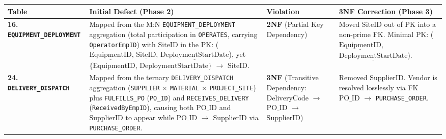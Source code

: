 \documentclass[a4paper,12pt]{report}
\newcounter{none} %
\begin{document}
{\footnotesize

{\def\LTcaptype{none} %
\begin{longtable}[]{@{}
  >{\raggedright\arraybackslash}p{}
  >{\raggedright\arraybackslash}p{}
  >{\centering\arraybackslash}p{}
  >{\raggedright\arraybackslash}p{}@{}}
\toprule\noalign{}
\begin{minipage}[b]{\linewidth}\raggedright
Table
\end{minipage} & \begin{minipage}[b]{\linewidth}\raggedright
Initial Defect (Phase 2)
\end{minipage} & \begin{minipage}[b]{\linewidth}\centering
Violation
\end{minipage} & \begin{minipage}[b]{\linewidth}\raggedright
3NF Correction (Phase 3)
\end{minipage} \\
\midrule\noalign{}
\endhead
\bottomrule\noalign{}
\endlastfoot
\textbf{16. \texttt{EQUIPMENT\_\allowbreak{}DEPLOYMENT}} & Mapped from the M:N \texttt{EQUIPMENT\_\allowbreak{}DEPLOYMENT} aggregation (total participation in \texttt{OPERATES}, carrying \texttt{OperatorEmpID}) with \(\text{SiteID}\) in the PK: (\(\underline{\text{EquipmentID}}\), \(\underline{\text{SiteID}}\), \(\underline{\text{DeploymentStartDate}}\)), yet \(\{\text{EquipmentID}\), \(\text{DeploymentStartDate}\}\) \(\rightarrow\) \(\text{SiteID}\). & \textbf{2NF} (Partial Key Dependency) & Moved \(\text{SiteID}\) out of PK into a non-prime FK. Minimal PK: (\(\underline{\text{EquipmentID}}\), \(\underline{\text{DeploymentStartDate}}\)). \\
\textbf{24. \texttt{DELIVERY\_\allowbreak{}DISPATCH}} & Mapped from the ternary \texttt{DELIVERY\_\allowbreak{}DISPATCH} aggregation (\texttt{SUPPLIER} \(\times\) \texttt{MATERIAL} \(\times\) \texttt{PROJECT\_\allowbreak{}SITE}) plus \texttt{FULFILLS\_\allowbreak{}PO} (\texttt{PO\_\allowbreak{}ID}) and \texttt{RECEIVES\_\allowbreak{}DELIVERY} (\texttt{ReceivedByEmpID}), causing both \(\text{PO\_ID}\) and \(\text{SupplierID}\) to appear while \(\text{PO\_ID}\) \(\rightarrow\) \(\text{SupplierID}\) via \texttt{PURCHASE\_\allowbreak{}ORDER}. & \textbf{3NF} (Transitive Dependency: \(\text{DeliveryCode}\) \(\rightarrow\) \(\text{PO\_ID}\) \(\rightarrow\) \(\text{SupplierID}\)) & Removed \(\text{SupplierID}\). Vendor is resolved losslessly via FK \(\text{PO\_ID}\) \(\rightarrow\) \texttt{PURCHASE\_\allowbreak{}ORDER}. \\
\end{longtable}
}

}
\end{document}

